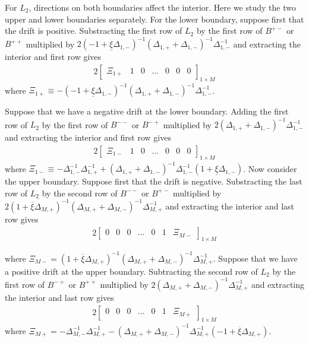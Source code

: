 \documentclass[11pt]{article}
\theoremstyle{definition}
\begin{document}
For $L_2$, directions on both boundaries affect the interior. Here we study the two upper and lower boundaries separately. For the lower boundary, suppose first that the drift is positive. Substracting the first row of $L_2$ by the first row of $B^{+-}$ or $B^{++}$ multiplied by $2(-1 + \underline{\xi} \Delta_{1,-} )^{-1} (\Delta_{1,+} + \Delta_{1,-})^{-1}  \Delta_{1,-}^{-1} $  and extracting the interior and first row gives
\begin{align}
2\begin{bmatrix}
\Xi_{1+} &1&0&\dots&0&0&0
\end{bmatrix}_{1\times M}
\end{align}
where $\Xi_{1+} \equiv  - (-1 + \underline{\xi} \Delta_{1,-})^{-1} (\Delta_{1,+} + \Delta_{1,-})^{-1}  \Delta_{1,-}^{-1}$.

Suppose that we have a negative drift at the lower boundary. Adding the first row of $L_2$ by the first row of $B^{--}$ or $B^{-+}$ multiplied by $2(\Delta_{1,+} + \Delta_{1,-} )^{-1} \Delta_{1,-}^{-1}$ and extracting the interior and first row gives
\begin{align}
2\begin{bmatrix}
\Xi_{1-} &1&0&\dots&0&0&0
\end{bmatrix}_{1\times M}
\end{align}
where $\Xi_{1-} \equiv -\Delta_{1,-}^{-1} \Delta_{1,+}^{-1}  + (\Delta_{1,+} + \Delta_{1,-} )^{-1} \Delta_{1,-}^{-1} (1 + \underline{\xi}\Delta_{1,-})$.
Now consider the upper boundary. Suppose first that the drift is negative. Substracting the last row of $L_2$ by the second row of $B^{--}$ or $B^{+-}$ multiplied by $2(1 + \overline{\xi} \Delta_{M,+} )^{-1} (\Delta_{M,+} + \Delta_{M,-})^{-1}  \Delta_{M,+}^{-1}$ and extracting the interior and last row gives 
\begin{align}
2\begin{bmatrix}
0 &0&0&\dots&0&1&\Xi_{M-}
\end{bmatrix}_{1\times M}
\end{align}

where $\Xi_{M-} = (1 + \overline{\xi} \Delta_{M,+})^{-1} (\Delta_{M,+} + \Delta_{M,-})^{-1}  \Delta_{M,+}^{-1}$. Suppose that we have a positive drift at the upper boundary. Subtracting the second row of $L_2$ by the first row of $B^{-+}$ or $B^{++}$ multiplied by $2(\Delta_{M,+} + \Delta_{M,-})^{-1} \Delta_{M,+}^{-1} $ and extracting the interior and last row gives
\begin{align}
2\begin{bmatrix}
0 &0&0&\dots&0&1&\Xi_{M+}
\end{bmatrix}_{1\times M}
\end{align}
where $\Xi_{M+} = -\Delta_{M,-}^{-1} \Delta_{M,+}^{-1} - ( \Delta_{M,+} + \Delta_{M,-} )^{-1} \Delta_{M,+}^{-1} (-1 + \overline{\xi} \Delta_{M,+})  $.
\end{document}
